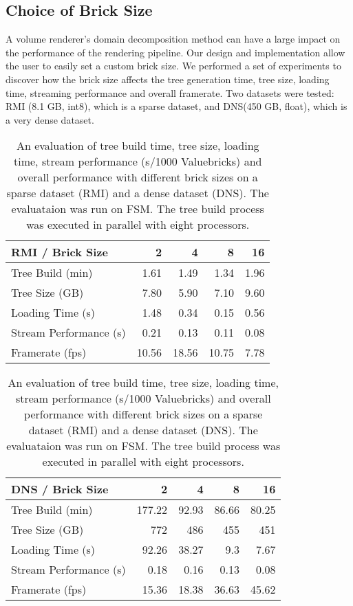 \subsection{Choice of Brick Size}
\label{sec:exp_bricksize}

A volume renderer's domain decomposition method can have a large impact on the 
performance of the rendering pipeline\cite{fogal2013analysis}. Our design and 
implementation allow the user to easily set a custom brick size. 
We performed a set of experiments to discover how the brick size affects the
tree generation time, tree size, loading time, streaming performance and overall
framerate. Two datasets were tested: RMI (8.1 GB, int8), which is a sparse dataset, and
DNS(450 GB, float), which is a very dense dataset.

\begin{table}[h!]
	\centering
	\begin{tabularx}{\linewidth}{l*{4}{r}}
		\toprule  
		\textbf{RMI / Brick Size}   & \textbf{2} & \textbf{4} & \textbf{8} & \textbf{16}  \\
		\hline
		Tree Build (min) & 1.61 & 1.49 & 1.34 & 1.96  \\
        Tree Size (GB) & 7.80 & 5.90 & 7.10 & 9.60  \\
        Loading Time (s) & 1.48 & 0.34 & 0.15 & 0.56  \\
        Stream Performance (s) & 0.21 & 0.13 & 0.11 & 0.08  \\
        Framerate (fps) & 10.56 & 18.56 & 10.75 & 7.78  \\
		\bottomrule
	\end{tabularx}
    \begin{tabularx}{\linewidth}{l*{4}{r}}
		\toprule  
		\textbf{DNS / Brick Size}   & \textbf{2} & \textbf{4} & \textbf{8} & \textbf{16}  \\
		\hline
		Tree Build (min) & 177.22 & 92.93 & 86.66 & 80.25  \\
        Tree Size (GB) & 772 & 486 & 455 & 451  \\
        Loading Time (s) & 92.26 & 38.27 & 9.3 & 7.67  \\
        Stream Performance (s) & 0.18 & 0.16 & 0.13 & 0.08  \\
        Framerate (fps) & 15.36 & 18.38 & 36.63 & 45.62  \\
		\bottomrule
	\end{tabularx}
	\caption{An evaluation of tree build time, tree size, loading time, stream performance (s/1000 Valuebricks) and overall performance with different brick sizes on a sparse dataset (RMI) and a dense dataset (DNS). The evaluataion was run on FSM. The tree build process was executed in parallel with eight processors.}
	\vspace{-1.5em}
	\label{table:brick_size}
\end{table}

